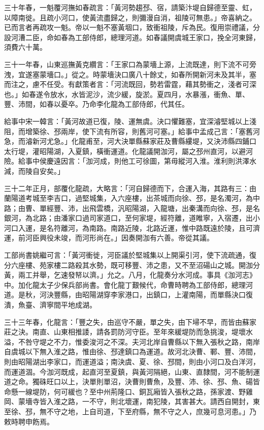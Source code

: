 三十年春，一魁覆河撫如春疏言：「黃河勢趨邳、宿，請築汴堤自歸德至靈、虹，以障南徙。且疏小河口，使黃流盡歸之，則彌漫自消，祖陵可無患。」帝喜納之。已而言者再疏攻一魁。帝以一魁不塞黃堌口，致衝祖陵，斥為民。復用崇禮議，分設河漕二臣，命如春為工部侍郎，總理河道。如春議開虞城王家口，挽全河東歸，須費六十萬。

三十一年春，山東巡撫黃克纘言：「王家口為蒙墻上源，上流既達，則下流不可旁洩，宜遂塞蒙墻口。」從之。時蒙墻決口廣八十餘丈，如春所開新河未及其半，塞而注之，慮不任受。有獻策者言：「河流既回，勢若雷霆，藉其勢衝之，淺者可深也。」如春遂令放水，水皆泥沙，流少緩，旋淤。夏四月，水暴漲，衝魚、單、豐、沛間，如春以憂卒。乃命李化龍為工部侍郎，代其任。

給事中宋一韓言：「黃河故道已復，陵、運無虞。決口懼難塞，宜深濬堅城以上淺阻，而增築徐、邳兩岸，使下流有所容，則舊河可塞。」給事中孟成己言：「塞舊河急，而濬新河尤急。」化龍甫至，河大決單縣蘇家莊及曹縣縷堤，又決沛縣四鋪口太行堤，灌昭陽湖，入夏鎮，橫衝運道。化龍議開泇河，屬之邳州直河，以避河險。給事中侯慶遠因言：「泇河成，則他工可徐圖，第毋縱河入淮。淮利則洪澤水減，而陵自安矣。」

三十二年正月，部覆化龍疏，大略言：「河自歸德而下，合運入海，其路有三：由蘭陽道考城至李吉口，過堅城集，入六座樓，出茶城而向徐、邳，是名濁河，為中路；由曹、單經豐、沛，出飛雲橋，汎昭陽湖，入龍塘，出秦溝而向徐、邳，是名銀河，為北路；由潘家口過司家道口，至何家堤，經符離，道睢寧，入宿遷，出小河口入運，是名符離河，為南路。南路近陵，北路近運，惟中路既遠於陵，且可濟運，前河臣興役未竣，而河形尚在。」因奏開泇有六善。帝從其議。

工部尚書姚繼可言：「黃河衝徙，河臣議於堅城集以上開渠引河，使下流疏通，復分六座樓、苑家樓二路殺其水勢，既可移豐、沛之患，又不至沼碭山之城。開泇分黃，兩工并舉，乞速發帑以濟。」允之。八月，化龍奏分水河成。事具《泇河志》中。加化龍太子少保兵部尚書。會化龍丁艱候代，命曹時聘為工部侍郎，總理河道。是秋，河決豐縣，由昭陽湖穿李家港口，出鎮口，上灌南陽，而單縣決口復潰，魚臺、濟寧間平地成湖。

三十三年春，化龍言：「豐之失，由巡守不嚴，單之失，由下埽不早，而皆由蘇家莊之決。南直、山東相推諉，請各罰防河守臣。至年來緩堤防而急挑浚，堤壞水溢，不咎守堤之不力，惟委浚河之不深。夫河北岸自曹縣以下無入張秋之路，南岸自虞城以下無入淮之路，惟由徐、邳達鎮口為運道。故河北決曹、鄆、豐、沛間，則由昭陽湖出李家口，而運道溢；南決虞、夏、徐、邳間，則由小河口及白洋河，而運道涸。今泇河既成，起直河至夏鎮，與黃河隔絕，山東、直隸間，河不能制運道之命。獨硃旺口以上，決單則單沼，決曹則曹魚，及豐、沛、徐、邳、魚、碭皆命懸一線堤防，何可緩也？至中州荊隆口、銅瓦廂皆入張秋之路，孫家渡、野雞岡、蒙墻寺皆入淮之路，一不守，則北壞運，南犯陵，其害甚大。請西自開封，東至徐、邳，無不守之地，上自司道，下至府縣，無不守之人，庶幾可息河患。」乃敕時聘申飭焉。

